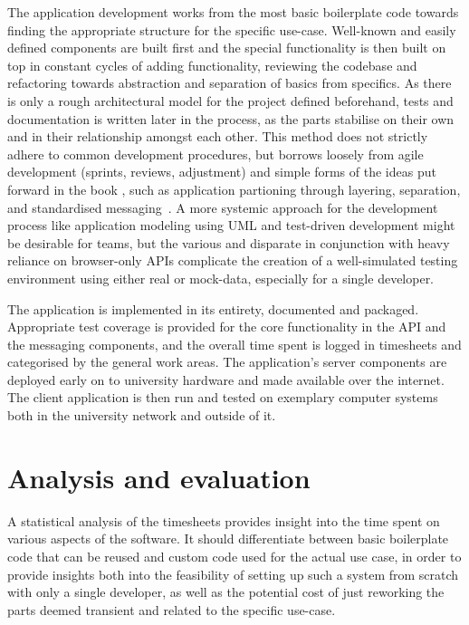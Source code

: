 The application development works from the most basic boilerplate code towards finding the appropriate structure for the specific use-case.
Well-known and easily defined components are built first and the special functionality is then built on top in constant cycles of adding functionality, reviewing the codebase and refactoring towards abstraction and separation of basics from specifics.
As there is only a rough architectural model for the project defined beforehand, tests and documentation is written later in the process, as the parts stabilise on their own and in their relationship amongst each other.
This method does not strictly adhere to common development procedures, but borrows loosely from agile development (sprints, reviews, adjustment) and simple forms of the ideas put forward in the book , such as application partioning through layering, separation, and standardised messaging~\parencite{patternOrientedSoftwareArchitecture}.
A more systemic approach for the development process like application modeling using \ac{UML} and test-driven development might be desirable for teams, but the various and disparate  in conjunction with heavy reliance on browser-only \ac{API}s complicate the creation of a well-simulated testing environment using either real or mock-data, especially for a single developer.

The application is implemented in its entirety, documented and packaged.
Appropriate test coverage is provided for the core functionality in the API and the messaging components, and the overall time spent is logged in timesheets and categorised by the general work areas.
The application's server components are deployed early on to university hardware and made available over the internet.
The client application is then run and tested on exemplary computer systems both in the university network and outside of it.

\section{Analysis and evaluation}
\label{sec:analysis-evaluation}

A statistical analysis of the timesheets provides insight into the time spent on various aspects of the software.
It should differentiate between basic boilerplate code that can be reused and custom code used for the actual use case, in order to provide insights both into the feasibility of setting up such a system from scratch with only a single developer, as well as the potential cost of just reworking the parts deemed transient and related to the specific use-case.

